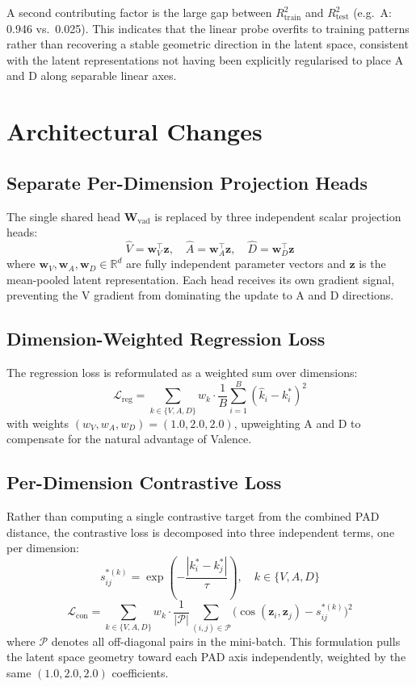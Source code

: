 A second contributing factor is the large gap between $R^2_{\text{train}}$ and $R^2_{\text{test}}$ (e.g.\ A: 0.946 vs.\ 0.025).
This indicates that the linear probe overfits to training patterns rather than recovering a stable geometric direction in the latent space, consistent with the latent representations not having been explicitly regularised to place A and D along separable linear axes.

\section{Architectural Changes}

\subsection{Separate Per-Dimension Projection Heads}

The single shared head $\mathbf{W}_{\text{vad}}$ is replaced by three independent scalar projection heads:
\[
    \hat{V} = \mathbf{w}_V^\top \mathbf{z}, \quad
    \hat{A} = \mathbf{w}_A^\top \mathbf{z}, \quad
    \hat{D} = \mathbf{w}_D^\top \mathbf{z}
\]
where $\mathbf{w}_V, \mathbf{w}_A, \mathbf{w}_D \in \mathbb{R}^d$ are fully independent parameter vectors and $\mathbf{z}$ is the mean-pooled latent representation.
Each head receives its own gradient signal, preventing the V gradient from dominating the update to A and D directions.

\subsection{Dimension-Weighted Regression Loss}

The regression loss is reformulated as a weighted sum over dimensions:
\[
    \mathcal{L}_{\text{reg}} = \sum_{k \in \{V, A, D\}} w_k \cdot \frac{1}{B}\sum_{i=1}^{B}(\hat{k}_i - k_i^*)^2
\]
with weights $(w_V, w_A, w_D) = (1.0, 2.0, 2.0)$, upweighting A and D to compensate for the natural advantage of Valence.

\subsection{Per-Dimension Contrastive Loss}

Rather than computing a single contrastive target from the combined PAD distance, the contrastive loss is decomposed into three independent terms, one per dimension:
\[
    s_{ij}^{*(k)} = \exp\!\left(-\frac{|k_i^* - k_j^*|}{\tau}\right), \quad k \in \{V, A, D\}
\]
\[
    \mathcal{L}_{\text{con}} = \sum_{k \in \{V, A, D\}} w_k \cdot \frac{1}{|\mathcal{P}|}\sum_{(i,j) \in \mathcal{P}} \bigl(\cos(\mathbf{z}_i, \mathbf{z}_j) - s_{ij}^{*(k)}\bigr)^2
\]
where $\mathcal{P}$ denotes all off-diagonal pairs in the mini-batch.
This formulation pulls the latent space geometry toward each PAD axis independently, weighted by the same $(1.0, 2.0, 2.0)$ coefficients.

